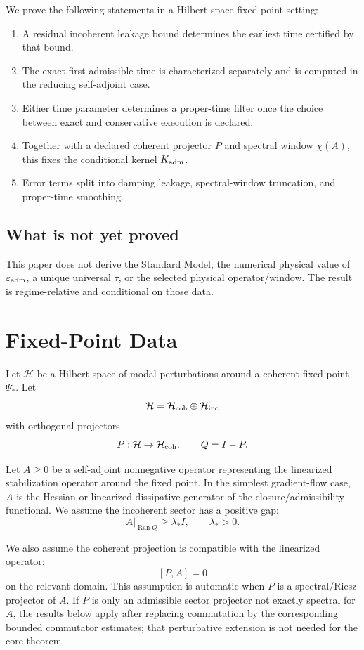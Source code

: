\documentclass[11pt]{article}
\begin{document}
We prove the following statements in a Hilbert-space fixed-point setting:

\begin{enumerate}
\item A residual incoherent leakage bound determines the earliest time certified by that bound.
\item The exact first admissible time is characterized separately and is computed in the reducing self-adjoint case.
\item Either time parameter determines a proper-time filter once the choice between exact and conservative execution is declared.
\item Together with a declared coherent projector \(P\) and spectral window \(\chi(A)\), this fixes the conditional kernel \(K_{\rm adm}\).
\item Error terms split into damping leakage, spectral-window truncation, and proper-time smoothing.
\end{enumerate}

\subsection*{What is not yet proved}

This paper does not derive the Standard Model, the numerical physical value of \(\varepsilon_{\rm adm}\), a unique universal \(\tau\), or the selected physical operator/window. The result is regime-relative and conditional on those data.

\section{Fixed-Point Data}

Let \(\mathcal H\) be a Hilbert space of modal perturbations around a coherent fixed point \(\Psi_\ast\). Let
\[
\mathcal H=\mathcal H_{\rm coh}\oplus \mathcal H_{\rm inc}
\]
with orthogonal projectors
\[
P:\mathcal H\to\mathcal H_{\rm coh},
\qquad
Q=I-P.
\]

Let \(A\ge0\) be a self-adjoint nonnegative operator representing the linearized stabilization operator around the fixed point. In the simplest gradient-flow case, \(A\) is the Hessian or linearized dissipative generator of the closure/admissibility functional. We assume the incoherent sector has a positive gap:
\[
A|_{\operatorname{Ran}Q}\ge \lambda_\ast I,
\qquad \lambda_\ast>0.
\]

We also assume the coherent projection is compatible with the linearized operator:
\[
[P,A]=0
\]
on the relevant domain. This assumption is automatic when \(P\) is a spectral/Riesz projector of \(A\). If \(P\) is only an admissible sector projector not exactly spectral for \(A\), the results below apply after replacing commutation by the corresponding bounded commutator estimates; that perturbative extension is not needed for the core theorem.
\end{document}
